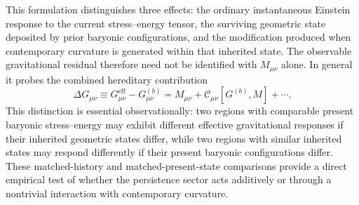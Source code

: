 This formulation distinguishes three effects: the ordinary instantaneous
Einstein response to the current stress--energy tensor, the surviving geometric
state deposited by prior baryonic configurations, and the modification produced
when contemporary curvature is generated within that inherited state.  The
observable gravitational residual therefore need not be identified with
\(M_{\mu\nu}\) alone.  In general it probes the combined hereditary contribution
\begin{equation}
    \Delta G_{\mu\nu}
    \equiv
    G_{\mu\nu}^{\mathrm{eff}}
    -
    G_{\mu\nu}^{(b)}
    =
    M_{\mu\nu}
    +
    \mathcal{C}_{\mu\nu}[G^{(b)},M]
    +\cdots .
    \label{eq:observable-geometric-residual}
\end{equation}
This distinction is essential observationally: two regions with comparable
present baryonic stress--energy may exhibit different effective gravitational
responses if their inherited geometric states differ, while two regions with
similar inherited states may respond differently if their present baryonic
configurations differ.  These matched-history and matched-present-state
comparisons provide a direct empirical test of whether the persistence sector
acts additively or through a nontrivial interaction with contemporary curvature.
